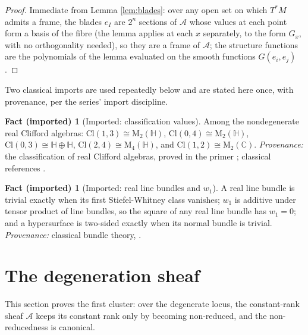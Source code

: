 \documentclass[11pt]{article}
\theoremstyle{definition}
\newtheorem{fact}[theorem]{Fact (imported)}
\newcommand{\Cl}{\mathrm{Cl}}
\newcommand{\HH}{\mathbb{H}}
\newcommand{\Mat}{\mathrm{M}}
\newcommand{\shA}{\mathcal{A}}
\begin{document}
\begin{proof}
Immediate from Lemma \ref{lem:blades}: over any open set on which $T^*M$ admits a frame, the blades $e_I$ are $2^n$ sections of $\shA$ whose values at each point form a basis of the fibre (the lemma applies at each $x$ separately, to the form $G_x$, with no orthogonality needed), so they are a frame of $\shA$; the structure functions are the polynomials of the lemma evaluated on the smooth functions $G(e_i, e_j)$.
\end{proof}

Two classical imports are used repeatedly below and are stated here once, with provenance, per the series' import discipline.

\begin{fact}[Imported: classification values]\label{fact:classvalues}
Among the nondegenerate real Clifford algebras: $\Cl(1,3) \cong \Mat_2(\HH)$, $\Cl(0,4) \cong \Mat_2(\HH)$, $\Cl(0,3) \cong \HH \oplus \HH$, $\Cl(2,4) \cong \Mat_4(\HH)$, and $\Cl(1,2) \cong \Mat_2(\mathbb{C})$. \emph{Provenance:} the classification of real Clifford algebras, proved in the primer \cite[Thm.~9.3]{ButlerT0}; classical references \cite{Porteous1995, Lounesto2001}.
\end{fact}

\begin{fact}[Imported: real line bundles and $w_1$]\label{fact:linebundles}
A real line bundle is trivial exactly when its first Stiefel-Whitney class vanishes; $w_1$ is additive under tensor product of line bundles, so the square of any real line bundle has $w_1 = 0$; and a hypersurface is two-sided exactly when its normal bundle is trivial. \emph{Provenance:} classical bundle theory, \cite[\S 4]{MilnorStasheff1974}.
\end{fact}

\section{The degeneration sheaf}\label{sec:degeneration}

This section proves the first cluster: over the degenerate locus, the constant-rank sheaf $\shA$ keeps its constant rank only by becoming non-reduced, and the non-reducedness is canonical.
\end{document}

